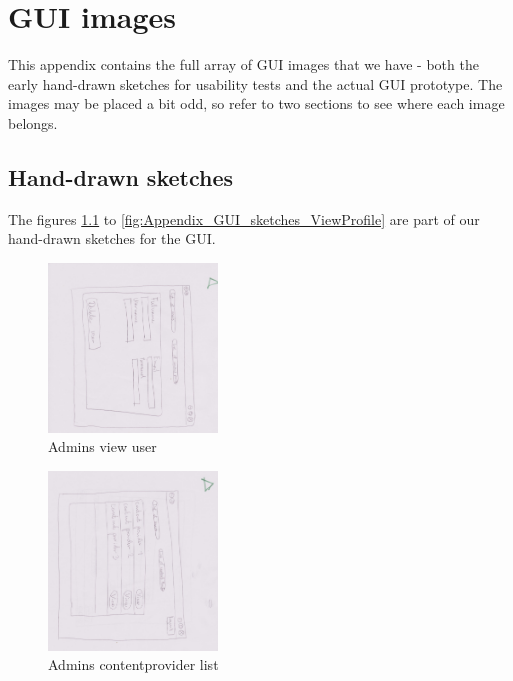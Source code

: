\chapter{GUI images}
\label{Appendix_GUI}
This appendix contains the full array of GUI images that we have - both the early hand-drawn sketches for usability tests and the actual GUI prototype. The images may be placed a bit odd, so refer to two sections to see where each image belongs.
\section{Hand-drawn sketches}
\label{Appendix_GUI_sketches}
The figures \ref{fig:Appendix_GUI_sketches_AdminViewUser} to \ref{fig:Appendix_GUI_sketches_ViewProfile} are part of our hand-drawn sketches for the GUI.
\begin{figure}[!ht]
  \centering
    \includegraphics[angle=90, width=0.4\textwidth]{Parts/Appendix/Images/PaperMockup/AdminViewUser}
  \caption{Admins view user}
  \label{fig:Appendix_GUI_sketches_AdminViewUser}
\end{figure}
\begin{figure}[!ht]
  \centering
    \includegraphics[angle=90, width=0.4\textwidth]{Parts/Appendix/Images/PaperMockup/AdminListofCPs}
  \caption{Admins contentprovider list}
  \label{fig:Appendix_GUI_sketches_AdminListofCP}
\end{figure}
